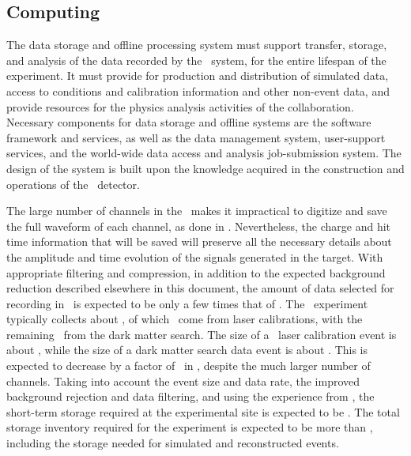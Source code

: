 \subsection{Computing}
\label{sec:Computing}

The data storage and offline processing system must support transfer, storage, and analysis of the data recorded by the \DAQ\ system, for the entire lifespan of the experiment.  It must provide for production and distribution of simulated data, access to conditions and calibration information and other non-event data, and provide resources for the physics analysis activities of the collaboration. Necessary components for data storage and offline systems are the software framework and services, as well as the data management system, user-support services, and the world-wide data access and analysis job-submission system.  The design of the system is built upon the knowledge acquired in the construction and operations of the \DSfs\ detector. 

The large number of channels in the \LArTPC\ makes it impractical to digitize and save the full waveform of each channel, as done in \DSfs.  Nevertheless, the charge and hit time information that will be saved will preserve all the necessary details about the amplitude and time evolution of the signals generated in the target. With appropriate filtering and compression, in addition to the expected background reduction described elsewhere in this document, the amount of data selected for recording in \DSks\ is expected to be only a few times that of \DSfs.  The \DSfs\ experiment typically collects about \DSfDataTotalRate, of which \DSfDataLaserRate\ come from laser calibrations, with the remaining \DSfDataDMSRate\ from the dark matter search.  The size of a \DSfs\ laser calibration event is about \DSfDataLaserSize, while the size of a dark matter search data event is about \DSfDataDMSSize.  This is expected to decrease by a factor of \DSkDSfDataReductionFactor\ in \DSks, despite the much larger number of channels.  Taking into account the event size and data rate, the improved background rejection and data filtering, and using the experience from \DSfs, the short-term storage required at the experimental site is expected to be \DSkDataStorageLNGSShortDisk.  The total storage inventory required for the experiment is expected to be more than \DSkDataStorageTotalDiskNewProposalExtended, including the storage needed for simulated and reconstructed events. 


